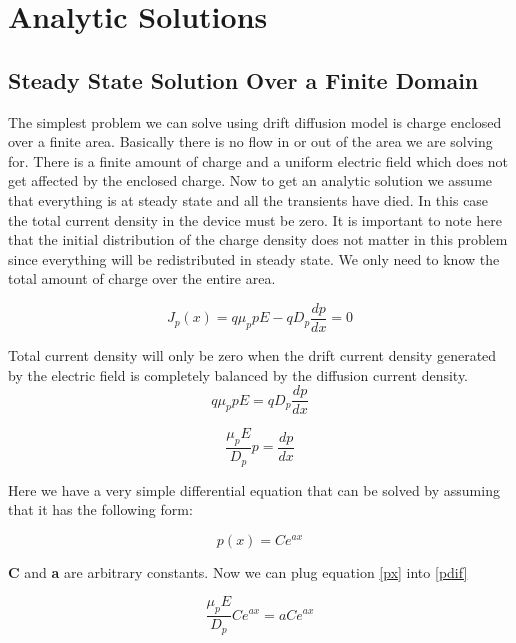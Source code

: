 \clearpage
\section{Analytic Solutions}
\subsection{Steady State Solution Over a Finite Domain}

The simplest problem we can solve using drift diffusion model is charge enclosed over a finite area. Basically there is no flow in or out of the area we are solving for. There is a finite amount of charge and a uniform electric field which does not get affected by the enclosed charge. Now to get an analytic solution we assume that everything is at steady state and all the transients have died. In this case the total current density in the device must be zero. It is important to note here that the initial distribution of the charge density does not matter in this problem since everything will be redistributed in steady state. We only need to know the total amount of charge over the entire area.

\begin{equation}
J_p(x)=q \mu_{p} p E-qD_{p} \frac{dp}{dx} =0
\end{equation}

Total current density will only be zero when the drift current density generated by the electric field is completely balanced by the diffusion current density.
\begin{equation}
q \mu_{p} p E=qD_{p} \frac{dp}{dx}
\end{equation}

\begin{equation}
 \frac{\mu_{p} E}{D_{p}} p  = \frac{dp}{dx}
 \label{pdif}
\end{equation}

Here we have a very simple differential equation that can be solved by assuming that it has the following form:

\begin{equation}
p(x)=Ce^{ax}
\label{px}
\end{equation}

\textbf{C} and \textbf{a} are arbitrary constants. Now we can plug equation \eqref{px} into \eqref{pdif}

\begin{equation}
 \frac{\mu_{p} E}{D_{p}} Ce^{ax}  = a Ce^{ax}
\end{equation}


